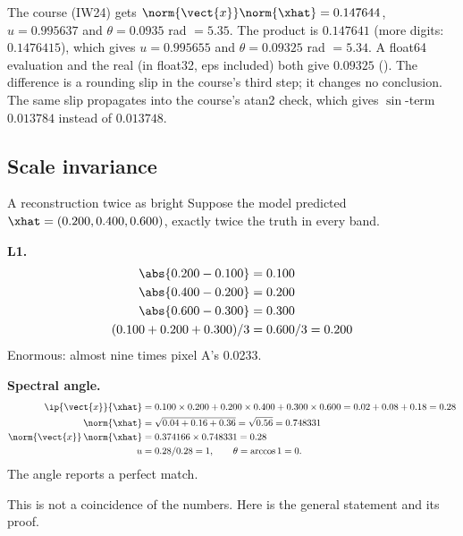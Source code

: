 \begin{sourcenote}
The course (IW24) gets $\norm{\vect{x}}\norm{\xhat} = 0.147644$, $u = 0.995637$ and $\theta =
0.0935$ rad $= 5.35$\textdegree. The product is $0.147641$ (more digits: $0.1476415$), which
gives $u = 0.995655$ and $\theta = 0.09325$ rad $= 5.34$\textdegree. A float64 evaluation and
the real  (in float32, eps included) both give $0.09325$ \tagC{}
(). The difference is a rounding slip
in the course's third step; it changes no conclusion. The same slip propagates into the
course's atan2 check, which gives $\sin$-term $0.013784$ instead of $0.013748$.
\end{sourcenote}

\subsection{Scale invariance}\label{sec:losses:scaleinv}

\begin{worked}[label={we:losses:double}]{A reconstruction twice as bright}
Suppose the model predicted $\xhat = (0.200, 0.400, 0.600)$, exactly twice the truth in
every band.

\textbf{L1.}
\begin{align*}
\abs{0.200 - 0.100} &= 0.100\\
\abs{0.400 - 0.200} &= 0.200\\
\abs{0.600 - 0.300} &= 0.300\\
(0.100 + 0.200 + 0.300)/3 &= 0.600/3 = 0.200
\end{align*}
Enormous: almost nine times pixel A's 0.0233.

\textbf{Spectral angle.}
\begin{align*}
\ip{\vect{x}}{\xhat} &= 0.100 \times 0.200 + 0.200 \times 0.400 + 0.300 \times 0.600 = 0.02 + 0.08 + 0.18 = 0.28\\
\norm{\xhat} &= \sqrt{0.04 + 0.16 + 0.36} = \sqrt{0.56} = 0.748331\\
\norm{\vect{x}}\,\norm{\xhat} &= 0.374166 \times 0.748331 = 0.28\\
u &= 0.28 / 0.28 = 1, \qquad \theta = \arccos 1 = 0.
\end{align*}
The angle reports a perfect match.
\end{worked}

This is not a coincidence of the numbers. Here is the general statement and its proof.

